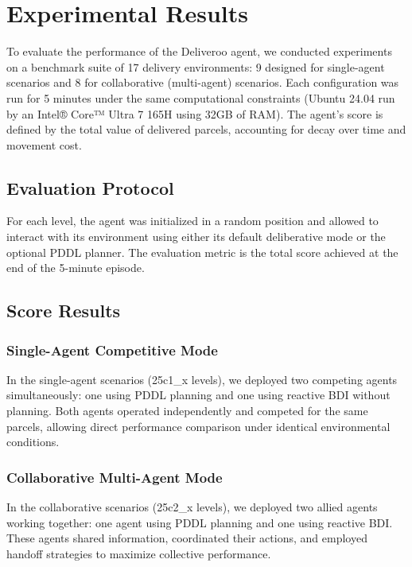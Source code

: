 \section{Experimental Results}

To evaluate the performance of the Deliveroo agent, we conducted experiments on a benchmark suite of 17 delivery environments: 9 designed for single-agent scenarios and 8 for collaborative (multi-agent) scenarios. Each configuration was run for 5 minutes under the same computational constraints (Ubuntu 24.04 run by an Intel® Core™ Ultra 7 165H using 32GB of RAM). The agent's score is defined by the total value of delivered parcels, accounting for decay over time and movement cost.

\subsection{Evaluation Protocol}

For each level, the agent was initialized in a random position and allowed to interact with its environment using either its default deliberative mode or the optional PDDL planner. The evaluation metric is the total score achieved at the end of the 5-minute episode.

\subsection{Score Results}

\subsubsection{Single-Agent Competitive Mode}

In the single-agent scenarios (25c1\_x levels), we deployed two competing agents simultaneously: one using PDDL planning and one using reactive BDI without planning. Both agents operated independently and competed for the same parcels, allowing direct performance comparison under identical environmental conditions.

\subsubsection{Collaborative Multi-Agent Mode}

In the collaborative scenarios (25c2\_x levels), we deployed two allied agents working together: one agent using PDDL planning and one using reactive BDI. These agents shared information, coordinated their actions, and employed handoff strategies to maximize collective performance.

